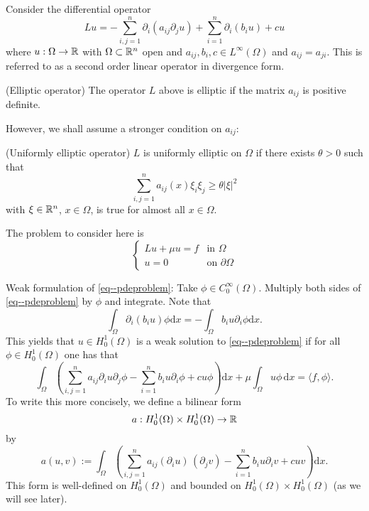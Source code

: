 \documentclass[11pt]{article}
\begin{document}
			Consider the differential operator
			\begin{equation}\label{main elliptic pde}
				Lu=-\sum_{i,j=1}^n\partial_i(a_{ij}\partial_ju)+\sum_{i=1}^n\partial_i(b_iu)+cu
			\end{equation}
			where $u:\Omega\rightarrow\mathbb{R}$ with $\Omega\subset\mathbb{R}^n$ open and $a_{ij},b_i,c\in L^\infty(\Omega)$ and $a_{ij}=a_{ji}$.  This is referred to as a second order linear operator in divergence form.
			
			\begin{defi}(Elliptic operator)
				The operator $L$ above is elliptic if the matrix $a_{ij}$ is positive definite.
			\end{defi} 

			However, we shall assume a stronger condition on $a_{ij}$: 
			
			\begin{defi}(Uniformly elliptic operator)
				$L$ is uniformly elliptic on $\Omega$ if there exists $\theta>0$ such that 
				\begin{equation*}
					\sum_{i,j=1}^na_{ij}(x)\xi_i\xi_j\ge\theta|\xi|^2
				\end{equation*}
				with $\xi\in\mathbb{R}^n$, $x\in\Omega$, is true for almost all $x\in\Omega$.
			\end{defi}
			
			The problem to consider here is 
			\begin{equation}\label{eq--pdeproblem}
				\begin{cases}
					Lu+\mu u=f & \text{in }\Omega\\
					u=0 & \text{on }\partial\Omega
				\end{cases}\tag{\ast}
			\end{equation}

			Weak formulation of \eqref{eq--pdeproblem}: Take $\phi\in C^\infty_0(\Omega)$. Multiply both sides of \eqref{eq--pdeproblem} by $\phi$ and integrate. Note that
			\begin{equation*}
				\int_\Omega \partial_i(b_i u)\phi \mathrm{d}x=-\int_\Omega b_iu\partial_i\phi \mathrm{d}x.
			\end{equation*}
			This yields that $u\in H^1_0(\Omega)$ is a weak solution to \eqref{eq--pdeproblem} if for all $\phi\in H^1 _0 (\Omega)$ one has that
			\begin{equation*}
    			\int_{\Omega}\left(\sum_{i,j=1}^na_{ij}\partial_iu \partial_j\phi-\sum_{i=1}^nb_iu\partial_i\phi+cu\phi\right) \mathrm{d}x +\mu\int_{\Omega} u\phi \, \mathrm{d}x=\langle f, \phi\rangle . 
			\end{equation*}
			To write this more concisely, we define a bilinear form
			\begin{equation*}
				a:H^1_0(\Omega)\times H^1_0(\Omega)\rightarrow\mathbb{R}
			\end{equation*}
			by 
			\begin{equation}\label{eq--bilinearform}
				a(u,v):=\int_\Omega\left(\sum_{i,j=1}^na_{ij}(\partial_i u)\,( \partial_j v)-\sum_{i=1}^nb_iu\partial_iv+cuv\right)\mathrm{d}x.
			\end{equation}
			This form is well-defined on $H^1_0(\Omega)$ and bounded on $H^1_0(\Omega)\times H^1_0(\Omega)$ (as we will see later).
\end{document}
